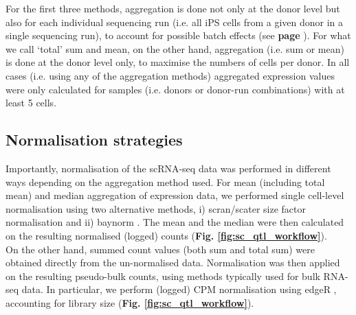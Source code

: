 
For the first three methods, aggregation is done not only at the donor level but also for each individual sequencing run (i.e. all iPS cells from a given donor in a single sequencing run), to account for possible batch effects (see \textbf{page \pageref{sec:sc_ipsc_eqtl}}).
For what we call `total' sum and mean, on the other hand, aggregation (i.e. sum or mean) is done at the donor level only, to maximise the numbers of cells per donor.
In all cases (i.e. using any of the aggregation methods) aggregated expression values were only calculated for samples (i.e. donors or donor-run combinations) with at least 5 cells.

\subsection{Normalisation strategies}

Importantly, normalisation of the scRNA-seq data was performed in different ways depending on the aggregation method used.
For mean (including total mean) and median aggregation of expression data, we performed single cell-level normalisation using two alternative methods, i) scran/scater \cite{mccarthy2017scater} size factor normalisation and ii) baynorm \cite{tang2020baynorm}.
The mean and the median were then calculated on the resulting normalised (logged) counts (\textbf{Fig. \ref{fig:sc_qtl_workflow}}). \\

On the other hand, summed count values (both sum and total sum) were obtained directly from the un-normalised data.
Normalisation was then applied on the resulting pseudo-bulk counts, using methods typically used for bulk RNA-seq data.
In particular, we perform (logged) CPM normalisation using edgeR \cite{robinson2010edger}, accounting for library size (\textbf{Fig. \ref{fig:sc_qtl_workflow}}).

